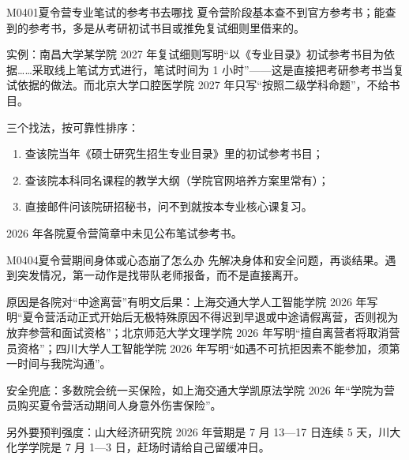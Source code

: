 \begin{qa}{M0401}{夏令营专业笔试的参考书去哪找}
夏令营阶段基本查不到官方参考书；能查到的参考书，多是从考研初试书目或推免复试细则里借来的。

实例：南昌大学某学院 2027 年复试细则写明“以《专业目录》初试参考书目为依据……采取线上笔试方式进行，笔试时间为 1 小时”——这是直接把考研参考书当复试依据的做法。而北京大学口腔医学院 2027 年只写“按照二级学科命题”，不给书目。

三个找法，按可靠性排序：
\begin{enumerate}
  \item 查该院当年《硕士研究生招生专业目录》里的初试参考书目；
  \item 查该院本科同名课程的教学大纲（学院官网培养方案里常有）；
  \item 直接邮件问该院研招秘书，问不到就按本专业核心课复习。
\end{enumerate}

2026 年各院夏令营简章中未见公布笔试参考书。
\end{qa}

\begin{qa}{M0404}{夏令营期间身体或心态崩了怎么办}
先解决身体和安全问题，再谈结果。遇到突发情况，第一动作是找带队老师报备，而不是直接离开。

原因是各院对“中途离营”有明文后果：上海交通大学人工智能学院 2026 年写明“夏令营活动正式开始后无极特殊原因不得迟到早退或中途请假离营，否则视为放弃参营和面试资格”；北京师范大学文理学院 2026 年写明“擅自离营者将取消营员资格”；四川大学人工智能学院 2026 年写明“如遇不可抗拒因素不能参加，须第一时间与我院沟通”。

安全兜底：多数院会统一买保险，如上海交通大学凯原法学院 2026 年“学院为营员购买夏令营活动期间人身意外伤害保险”。

另外要预判强度：山大经济研究院 2026 年营期是 7 月 13—17 日连续 5 天，川大化学学院是 7 月 1—3 日，赶场时请给自己留缓冲日。
\end{qa}

